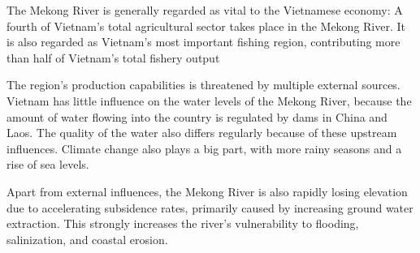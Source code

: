 The Mekong River is generally regarded as vital to the Vietnamese economy: A fourth of Vietnam's total agricultural sector takes place in the Mekong River. It is also regarded as Vietnam's most important fishing region, contributing more than half of Vietnam's total fishery output \cite{vietstats}

The region's production capabilities is threatened by multiple external sources. Vietnam has little influence on the water levels of the Mekong River, because the amount of water flowing into the country is regulated by dams in China and Laos. The quality of the water also differs regularly because of these upstream influences. Climate change also plays a big part, with more rainy seasons and a rise of sea levels. \cite{wur}

Apart from external influences, the Mekong River is also rapidly losing elevation due to accelerating subsidence rates, primarily caused by increasing ground water extraction. This strongly increases the river’s vulnerability to flooding, salinization, and coastal erosion. \cite{minderhoud2020}